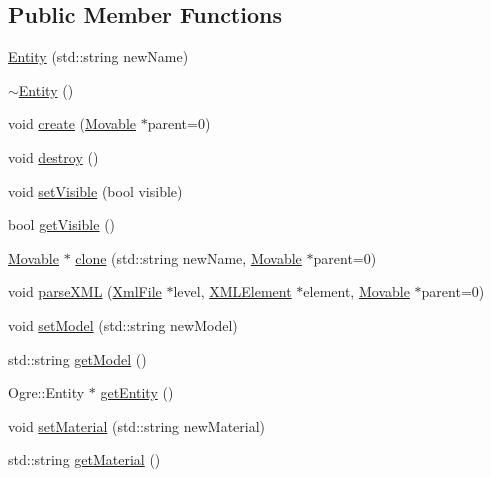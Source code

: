\subsection*{Public Member Functions}
\begin{DoxyCompactItemize}
\item 
\hyperlink{class_rad_xml_1_1_entity_acb472376f358513eba41cc141abdf890}{Entity} (std\-::string new\-Name)
\item 
\hyperlink{class_rad_xml_1_1_entity_a35b3b78ce44a85d7fe193f17b062d033}{$\sim$\-Entity} ()
\item 
void \hyperlink{class_rad_xml_1_1_entity_a13317cdbe8fecb18937398b17476f0c9}{create} (\hyperlink{class_rad_xml_1_1_movable}{Movable} $\ast$parent=0)
\item 
void \hyperlink{class_rad_xml_1_1_entity_a1e687923e63ddaa1d9ee5b1ed2e533c7}{destroy} ()
\item 
void \hyperlink{class_rad_xml_1_1_entity_a7e331dda6014328ada034880278ba55c}{set\-Visible} (bool visible)
\item 
bool \hyperlink{class_rad_xml_1_1_entity_a5c171ff77585813b812c803278fae042}{get\-Visible} ()
\item 
\hyperlink{class_rad_xml_1_1_movable}{Movable} $\ast$ \hyperlink{class_rad_xml_1_1_entity_aae568dc63022b3195e625bc4533f4aa2}{clone} (std\-::string new\-Name, \hyperlink{class_rad_xml_1_1_movable}{Movable} $\ast$parent=0)
\item 
void \hyperlink{class_rad_xml_1_1_entity_a0c1871cedc67abcdad8bd7759272050c}{parse\-X\-M\-L} (\hyperlink{class_rad_xml_1_1_xml_file}{Xml\-File} $\ast$level, \hyperlink{class_x_m_l_element}{X\-M\-L\-Element} $\ast$element, \hyperlink{class_rad_xml_1_1_movable}{Movable} $\ast$parent=0)
\item 
void \hyperlink{class_rad_xml_1_1_entity_a80910185e56c93d81b817dc05d23f352}{set\-Model} (std\-::string new\-Model)
\item 
std\-::string \hyperlink{class_rad_xml_1_1_entity_a3f50dfab0731be07410eafa280f9fa71}{get\-Model} ()
\item 
Ogre\-::\-Entity $\ast$ \hyperlink{class_rad_xml_1_1_entity_ae540e16ff777284e525f307fc7f49267}{get\-Entity} ()
\item 
void \hyperlink{class_rad_xml_1_1_entity_a85d0d8815525db092ef5832349628f44}{set\-Material} (std\-::string new\-Material)
\item 
std\-::string \hyperlink{class_rad_xml_1_1_entity_a2c53b7d09a1370d057c714afc726a7e4}{get\-Material} ()
\end{DoxyCompactItemize}
